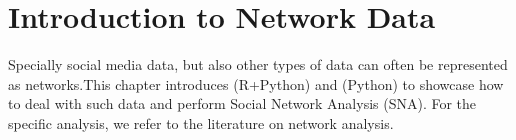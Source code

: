 \chapter{Introduction to Network Data}
\label{chap:network}

Specially social media data, but also other types of data can often be represented as networks.This chapter introduces  (R+Python) and  (Python) to showcase how to deal with such data and perform Social Network Analysis (SNA). For the specific analysis, we refer to the literature on network analysis.




